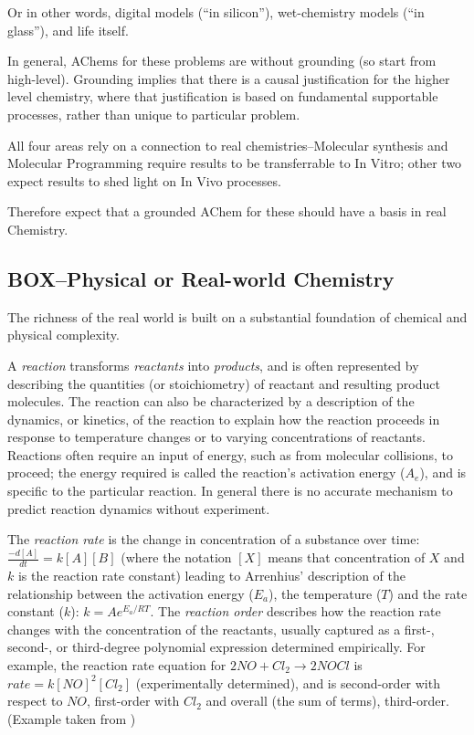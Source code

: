 Or in other words, digital models (``in silicon''), wet-chemistry models
(``in glass''), and life itself.

In general, AChems for these problems are without grounding (so start
from high-level). Grounding implies that there is a causal justification
for the higher level chemistry, where that justification is based on
fundamental supportable processes, rather than unique to particular
problem.

All four areas rely on a connection to real chemistries--Molecular
synthesis and Molecular Programming require results to be transferrable
to In Vitro; other two expect results to shed light on In Vivo
processes.

Therefore expect that a grounded AChem for these should have a basis in
real Chemistry.

\subsection{BOX--Physical or Real-world Chemistry}\label{box -- physical-or-real-world-chemistry}

The richness of the real world is built on a substantial foundation of
chemical and physical complexity.

A \textit{reaction} transforms \emph{reactants} into \emph{products},
and is often represented by describing the quantities (or stoichiometry)
of reactant and resulting product molecules. The reaction can also be
characterized by a description of the dynamics, or kinetics, of the
reaction to explain how the reaction proceeds in response to temperature
changes or to varying concentrations of reactants. Reactions often
require an input of energy, such as from molecular collisions, to
proceed; the energy required is called the reaction's activation energy
(\(A_e\)), and is specific to the particular reaction. In general there
is no accurate mechanism to predict reaction dynamics without
experiment.

The \textit{reaction rate} is the change in concentration of a substance
over time: \(\frac{-d[A]}{dt} = k[A][B]\) (where the notation \([X]\)
means that concentration of \(X\) and \(k\) is the reaction rate
constant) leading to Arrenhius' description of the relationship between
the activation energy (\(E_a\)), the temperature (\(T\)) and the rate
constant (\(k\)): \(k = Ae^{E_a/RT}\). The \textit{reaction order}
describes how the reaction rate changes with the concentration of the
reactants, usually captured as a first-, second-, or third-degree
polynomial expression determined empirically. For example, the reaction
rate equation for \(2NO + Cl_2 \rightarrow 2NOCl\) is
\(rate = k[NO]^2[Cl_2]\) (experimentally determined), and is
second-order with respect to \(NO\), first-order with \(Cl_2\) and
overall (the sum of terms), third-order. (Example taken from
\autocite{Kotz2006})

